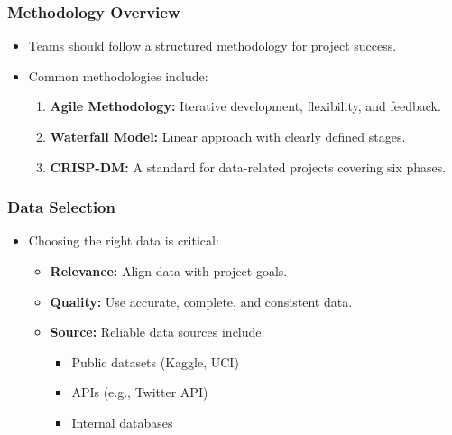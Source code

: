 \documentclass{beamer}
\begin{document}
\begin{frame}[fragile]
    \frametitle{Methodology Overview}
    \begin{itemize}
        \item Teams should follow a structured methodology for project success.
        \item Common methodologies include:
        \begin{enumerate}
            \item \textbf{Agile Methodology:} Iterative development, flexibility, and feedback.
            \item \textbf{Waterfall Model:} Linear approach with clearly defined stages.
            \item \textbf{CRISP-DM:} A standard for data-related projects covering six phases.
        \end{enumerate}
    \end{itemize}
\end{frame}

\begin{frame}[fragile]
    \frametitle{Data Selection}
    \begin{itemize}
        \item Choosing the right data is critical:
        \begin{itemize}
            \item \textbf{Relevance:} Align data with project goals.
            \item \textbf{Quality:} Use accurate, complete, and consistent data.
            \item \textbf{Source:} Reliable data sources include:
            \begin{itemize}
                \item Public datasets (Kaggle, UCI)
                \item APIs (e.g., Twitter API)
                \item Internal databases
            \end{itemize}
        \end{itemize}
    \end{itemize}
\end{frame}
\end{document}
